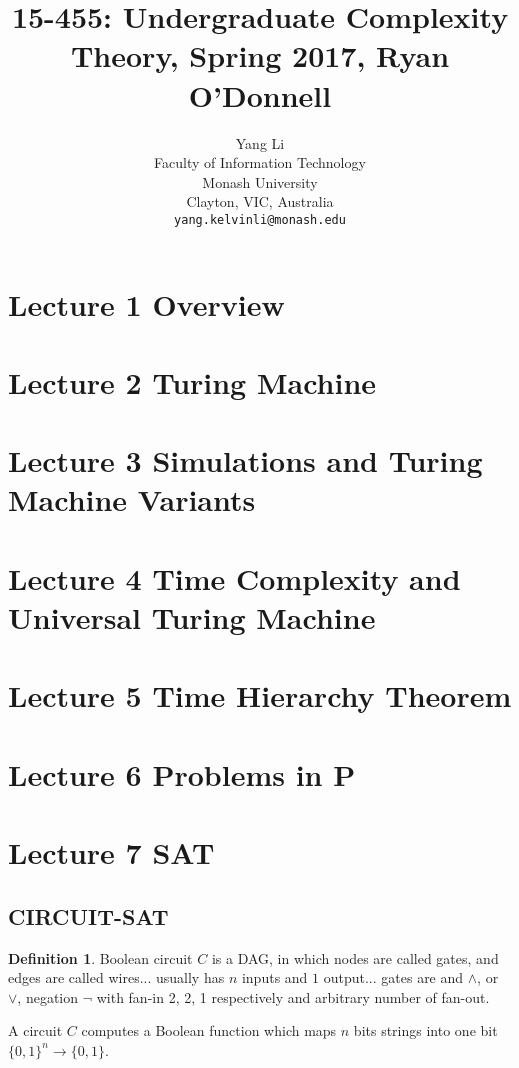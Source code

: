 \documentclass{article}
\title{15-455: Undergraduate Complexity Theory, Spring 2017, Ryan O'Donnell}
\author{
  Yang Li\\
  Faculty of Information Technology\\
  Monash University\\
  Clayton, VIC, Australia \\
  \texttt{yang.kelvinli@monash.edu} \\
}
\theoremstyle{plain}
\theoremstyle{definition}
\newtheorem{definition}{Definition}[section] %
\begin{document}
\maketitle

\section{Lecture 1 Overview}

\section{Lecture 2 Turing Machine}

\section{Lecture 3 Simulations and Turing Machine Variants}

\section{Lecture 4 Time Complexity and Universal Turing Machine}

\section{Lecture 5 Time Hierarchy Theorem}

\section{Lecture 6 Problems in P}

\section{Lecture 7 SAT}

\subsection{CIRCUIT-SAT}

\begin{definition}
Boolean circuit $C$ is a DAG, in which nodes are called gates, and edges are called wires... usually has $n$ inputs and $1$ output... gates are and $\land$, or $\lor$, negation $\lnot$ with fan-in 2, 2, 1 respectively and arbitrary number of fan-out. 
\end{definition}

A circuit $C$ computes a Boolean function which maps $n$ bits strings into one bit $\{0,1\}^n \rightarrow \{0,1\}$. 
\end{document}
